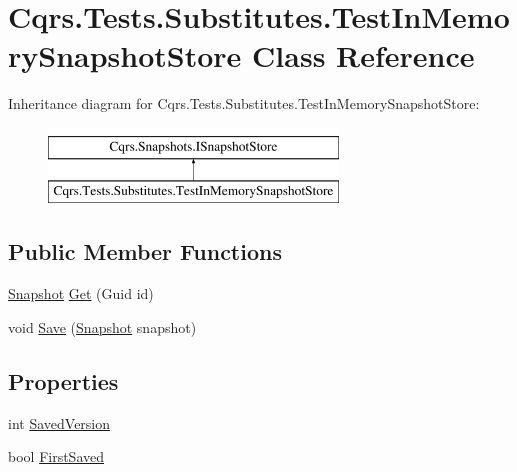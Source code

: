 \hypertarget{classCqrs_1_1Tests_1_1Substitutes_1_1TestInMemorySnapshotStore}{}\section{Cqrs.\+Tests.\+Substitutes.\+Test\+In\+Memory\+Snapshot\+Store Class Reference}
\label{classCqrs_1_1Tests_1_1Substitutes_1_1TestInMemorySnapshotStore}
Inheritance diagram for Cqrs.\+Tests.\+Substitutes.\+Test\+In\+Memory\+Snapshot\+Store\+:\begin{figure}[H]
\begin{center}
\leavevmode
\includegraphics[height=2.000000cm]{classCqrs_1_1Tests_1_1Substitutes_1_1TestInMemorySnapshotStore}
\end{center}
\end{figure}
\subsection*{Public Member Functions}
\begin{DoxyCompactItemize}
\item 
\hyperlink{classCqrs_1_1Snapshots_1_1Snapshot}{Snapshot} \hyperlink{classCqrs_1_1Tests_1_1Substitutes_1_1TestInMemorySnapshotStore_a4e149196381a80cc9c53cdbb67b8dcaa_a4e149196381a80cc9c53cdbb67b8dcaa}{Get} (Guid id)
\item 
void \hyperlink{classCqrs_1_1Tests_1_1Substitutes_1_1TestInMemorySnapshotStore_afec5ba3ed2b39625b3ccfb002d1c935e_afec5ba3ed2b39625b3ccfb002d1c935e}{Save} (\hyperlink{classCqrs_1_1Snapshots_1_1Snapshot}{Snapshot} snapshot)
\end{DoxyCompactItemize}
\subsection*{Properties}
\begin{DoxyCompactItemize}
\item 
int \hyperlink{classCqrs_1_1Tests_1_1Substitutes_1_1TestInMemorySnapshotStore_a9924a25c49a5aca8fa2f29ca84ad0d11_a9924a25c49a5aca8fa2f29ca84ad0d11}{Saved\+Version}
\item 
bool \hyperlink{classCqrs_1_1Tests_1_1Substitutes_1_1TestInMemorySnapshotStore_a8e78ba4aad268910f35df0eb083d9883_a8e78ba4aad268910f35df0eb083d9883}{First\+Saved}
\end{DoxyCompactItemize}


